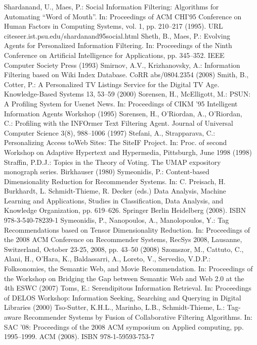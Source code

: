 \begin{thebibliography}{99}
Shardanand, U., Maes, P.: Social Information Filtering: Algorithms for Automating “Word of Mouth”. In: Proceedings of ACM CHI’95 Conference on Human Factors in Computing Systems, vol. 1, pp. 210–217 (1995). URL citeseer.ist.psu.edu/shardanand95social.html
Sheth, B., Maes, P.: Evolving Agents for Personalized Information Filtering. In: Proceedings of the Ninth Conference on Artificial Intelligence for Applications, pp. 345–352. IEEE Computer Society Press (1993)
Smirnov, A.V., Krizhanovsky, A.: Information Filtering based on Wiki Index Database. CoRR abs/0804.2354 (2008)
Smith, B., Cotter, P.: A Personalized TV Listings Service for the Digital TV Age. Knowledge-Based Systems 13, 53–59 (2000)
Sorensen, H., McElligott, M.: PSUN: A Profiling System for Usenet News. In: Proceedings of CIKM ’95 Intelligent Information Agents Workshop (1995)
Sorensen, H., O’Riordan, A., O’Riordan, C.: Profiling with the INFOrmer Text Filtering Agent. Journal of Universal Computer Science 3(8), 988–1006 (1997)
Stefani, A., Strapparava, C.: Personalizing Access toWeb Sites: The SiteIF Project. In: Proc. of second Workshop on Adaptive Hypertext and Hypermedia, Pittsburgh, June 1998 (1998)
Straffin, P.D.J.: Topics in the Theory of Voting. The UMAP expository monograph series. Birkhauser (1980)
Symeonidis, P.: Content-based Dimensionality Reduction for Recommender Systems. In: C. Preisach, H. Burkhardt, L. Schmidt-Thieme, R. Decker (eds.) Data Analysis, Machine Learning and Applications, Studies in Classification, Data Analysis, and Knowledge Organization, pp. 619–626. Springer Berlin Heidelberg (2008). ISBN 978-3-540-78239-1
Symeonidis, P., Nanopoulos, A., Manolopoulos, Y.: Tag Recommendations based on Tensor Dimensionality Reduction. In: Proceedings of the 2008 ACM Conference on Recommender Systems, RecSys 2008, Lausanne, Switzerland, October 23-25, 2008, pp. 43–50 (2008)
Szomszor, M., Cattuto, C., Alani, H., O’Hara, K., Baldassarri, A., Loreto, V., Servedio, V.D.P.: Folksonomies, the Semantic Web, and Movie Recommendation. In: Proceedings of the Workshop on Bridging the Gap between Semantic Web and Web 2.0 at the 4th ESWC (2007)
Toms, E.: Serendipitous Information Retrieval. In: Proceedings of DELOS Workshop: Information Seeking, Searching and Querying in Digital Libraries (2000)
Tso-Sutter, K.H.L., Marinho, L.B., Schmidt-Thieme, L.: Tag-aware Recommender Systems by Fusion of Collaborative Filtering Algorithms. In: SAC ’08: Proceedings of the 2008 ACM symposium on Applied computing, pp. 1995–1999. ACM (2008). ISBN 978-1-59593-753-7

\end{thebibliography}

